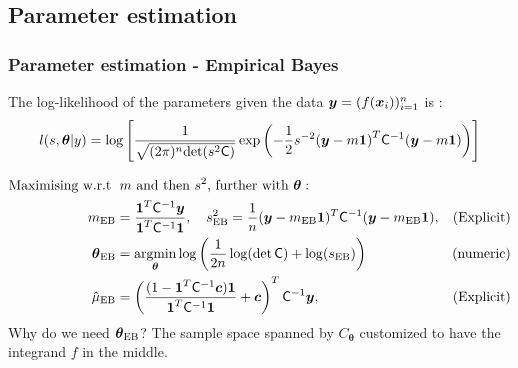 \documentclass[handout, 10pt,compress,xcolor={usenames,dvipsnames}]{beamer} %
\newcommand{\bm}[1]{\boldsymbol{#1}}
\newcommand{\MLE}{\textup{EB}}
\newcommand{\mCInv}{\mC^{-1}}
\newcommand{\vthetaMLE}{{\vtheta}_{\MLE}}
\renewcommand{\vtheta}{{\bm{\theta}}}
\newcommand{\pause}{}
\begin{document}
\subsection{Parameter estimation}



\begin{frame}
\frametitle{Parameter estimation - Empirical Bayes}
\vspace*{-6ex}
The log-likelihood of the parameters given the data $\boldsymbol{y} = (f(\boldsymbol{x}_i))_{i=1}^{n}$ is :
\vspace*{-2.0ex}
\begin{align*}
\displaystyle
l(s,\vtheta|y)=
\log
\left[
\frac{1}
{\sqrt{(2\pi)^n\text{det}(s^2\mC)}}
\exp{\left(
-\frac{1}{2}s^{-2}{(\vy-m\bm{1})}^T \mC^{-1} (\vy-m\bm{1})
\right)}
\right]
\end{align*}
\pause
\vspace{-4ex}
\begin{align*}
\text{Maximising w.r.t }&\;  m \text{ and then $s^2$, further with $\vtheta$}: \;
\\
m_{\MLE} &= \frac{\bm{1}^T \mC^{-1} \vy}{\bm{1}^T \mC^{-1} \bm{1}}, \quad
s^2_{\MLE} =
\frac{1}{n} (\vy-m_{\MLE}\bm{1})^T \mC^{-1} (\vy-m_{\MLE}\bm{1})  , & \text{(Explicit)}
\\
\vthetaMLE &= \argmin_{\vtheta}
\log
\left(
\frac{1}{2n} \log(\det \mC) + \log(s_\MLE)
\right)
 & \text{(numeric)}
\\
\hmu_\MLE  &= 
\left(
\frac{ (1 - \vone^T  \mCInv\vc )  \vone }{ \vone^T \mCInv \vone}   +  \vc 
\right)^T  \mCInv \vy  , & \text{(Explicit)}
\end{align*}
\pause %
\alert{Why do we need $\vtheta_{\MLE}$?} \quad The sample space spanned by $C_{\vtheta}$ customized to have the integrand $f$ in the middle.
\end{frame}



\end{document}
